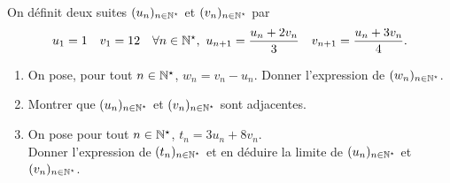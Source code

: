 \documentclass[a4paper, 11pt]{article}
\begin{document}
\begin{exercice} \;
On d\'efinit deux suites $(u_n)_{n\in\mathbb{N}^{\star}}$ et $(v_n)_{n\in\mathbb{N}^{\star}}$ par 
$$u_1=1\quad v_1=12\quad \forall n\in\N^{\star},\ u_{n+1}=\ddp\frac{u_n+2v_n}{3}\quad v_{n+1}=\ddp\frac{u_n+3v_n}{4}.$$
\begin{enumerate}
 \item
On pose, pour tout $n\in\mathbb{N}^{\star}$, $w_n=v_n-u_n$. Donner l'expression de $(w_n)_{n\in\mathbb{N}^{\star}}$. 
\item 
Montrer que $(u_n)_{n\in\mathbb{N}^{\star}}$ et $(v_n)_{n\in\mathbb{N}^{\star}}$ sont adjacentes.
\item 
On pose pour tout $n\in\mathbb{N}^{\star}$, $t_n=3u_n+8v_n$. \\
Donner l'expression de $(t_n)_{n\in\mathbb{N}^{\star}}$ et en d\'eduire la limite de $(u_n)_{n\in\mathbb{N}^{\star}}$ et $(v_n)_{n\in\mathbb{N}^{\star}}$.
\end{enumerate}
\end{exercice}
\vspace{0.5cm}
\end{document}
